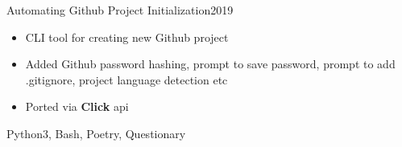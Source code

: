 \begin{projects}
	
	\project
	{Automating Github Project Initialization}{2019}
	{}
	{\vspace{-3mm}
	\begin{itemize}
	    \item CLI tool for creating new Github project
	    \item Added Github password hashing, prompt to save password, prompt to add .gitignore, project language detection etc
	    \item Ported via \textbf{Click} api
	\end{itemize}
	}
	{Python3, Bash, Poetry, Questionary}

\end{projects}

